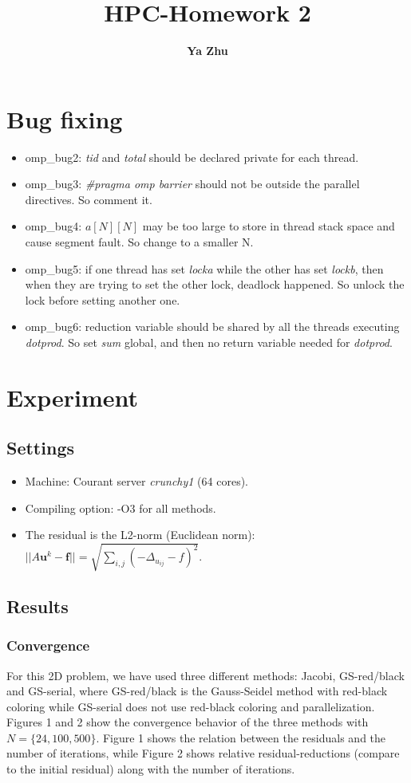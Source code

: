 \documentclass[11pt, oneside]{article}   	%
\title{\bf HPC-Homework 2}
\author{\bf \large Ya Zhu}
\date{}							%
\begin{document}
\maketitle 
\section{Bug fixing}
\begin{itemize}
\item omp\_bug2: \emph{tid} and \emph{total} should be declared private for each thread.
\item omp\_bug3: \emph{\#pragma omp barrier} should not be outside the parallel directives. So comment it.
\item omp\_bug4: $a[N][N]$ may be too large to store in thread stack space and cause segment fault. So change to a smaller N.
\item omp\_bug5: if one thread has set \emph{locka} while the other has set \emph{lockb}, then when they are trying to set the other lock, deadlock happened. So unlock the lock before setting another one.
\item omp\_bug6: reduction variable should be shared by all the threads executing \emph{dotprod}. So set \emph{sum} global, and then no return variable needed for \emph{dotprod}.
\end{itemize}
\section{Experiment}
\subsection{Settings}
\begin{itemize}
\item Machine: Courant server \emph{crunchy1} (64 cores).
\item Compiling option: -O3 for all methods.
\item The residual is the L2-norm (Euclidean norm): $||A\boldsymbol{u}^k-\boldsymbol{f}||=\sqrt{\sum_{i,j}({-\Delta_{u_{ij}}-f})^2}$.
\end{itemize}
\subsection{Results}
\subsubsection{Convergence}
For this 2D problem, we have used three different methods: Jacobi, GS-red/black and GS-serial, where GS-red/black is the Gauss-Seidel method with red-black coloring while GS-serial does not use red-black coloring and parallelization. Figures 1 and 2 show the convergence behavior of the three methods with $N=\{24,100,500\}$. Figure 1 shows the relation between the residuals and the number of iterations, while Figure 2 shows relative residual-reductions (compare to the initial residual) along with the number of iterations. 
\end{document}
